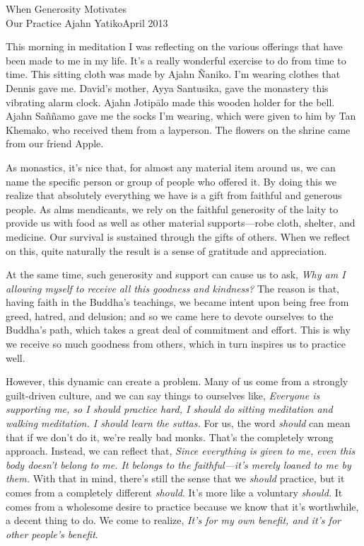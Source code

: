 {When Generosity Motivates\\Our Practice}
{Ajahn Yatiko}{April 2013}

This morning in meditation I was reflecting on the various offerings 
that have been made to me in my life. It's a really wonderful exercise 
to do from time to time. This sitting cloth was made by Ajahn Ñaniko. 
I'm wearing clothes that Dennis gave me. David's mother, Ayya 
Santusika, gave the monastery this vibrating alarm clock. Ajahn 
Jotipālo made this wooden holder for the bell. Ajahn Saññamo gave me 
the socks I'm wearing, which were given to him by Tan Khemako, who 
received them from a layperson. The flowers on the shrine came from our 
friend Apple.

As monastics, it's nice that, for almost any material item around us, 
we can name the specific person or group of people who offered it. By 
doing this we realize that absolutely everything we have is a gift from 
faithful and generous people. As alms mendicants, we rely on the 
faithful generosity of the laity to provide us with food as well as 
other material supports---robe cloth, shelter, and medicine. Our 
survival is sustained through the gifts of others. When we reflect on 
this, quite naturally the result is a sense of gratitude and 
appreciation.

At the same time, such generosity and support can cause us to ask, 
\emph{Why am I allowing myself to receive all this goodness and 
kindness?} The reason is that, having faith in the Buddha's teachings, 
we became intent upon being free from greed, hatred, and delusion; and 
so we came here to devote ourselves to the Buddha's path, which takes a 
great deal of commitment and effort. This is why we receive so much 
goodness from others, which in turn inspires us to practice well.

However, this dynamic can create a problem. Many of us come from a 
strongly guilt-driven culture, and we can say things to ourselves like, 
\emph{Everyone is supporting me, so I should practice hard, I should do 
sitting meditation and walking meditation. I should learn the suttas.} 
For us, the word \emph{should} can mean that if we don't do it, we're 
really bad monks. That's the completely wrong approach. Instead, we can 
reflect that, \emph{Since everything is given to me, even this body 
doesn't belong to me. It belongs to the faithful---it's merely loaned 
to me by them.} With that in mind, there's still the sense that we 
\emph{should} practice, but it comes from a completely different 
\emph{should}. It's more like a voluntary \emph{should.} It comes from 
a wholesome desire to practice because we know that it's worthwhile, a 
decent thing to do. We come to realize, \emph{It's for my own benefit, 
and it's for other people's benefit}.

